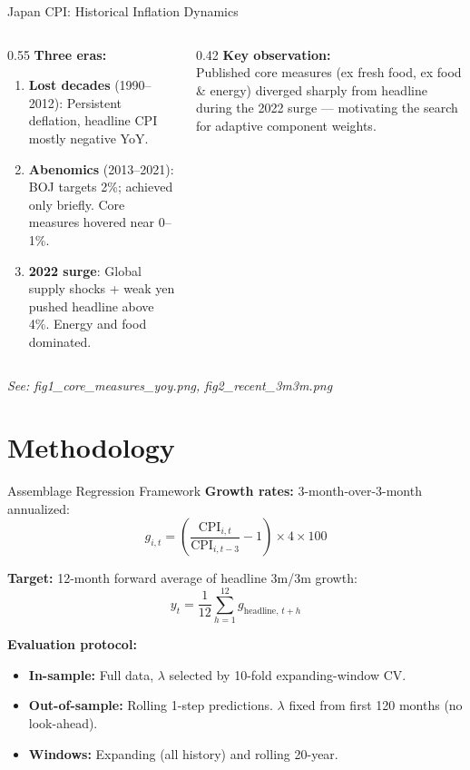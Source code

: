 \documentclass[aspectratio=169, 11pt]{beamer}
\begin{document}
\begin{frame}{Japan CPI: Historical Inflation Dynamics}
  \begin{columns}[T]
    \begin{column}{0.55\textwidth}
      \textbf{Three eras:}
      \begin{enumerate}
        \item \textbf{Lost decades} (1990--2012): Persistent deflation, headline
              CPI mostly negative YoY.
        \item \textbf{Abenomics} (2013--2021): BOJ targets 2\%; achieved only
              briefly.  Core measures hovered near 0--1\%.
        \item \textbf{2022 surge}: Global supply shocks + weak yen pushed
              headline above 4\%.  Energy and food dominated.
      \end{enumerate}
    \end{column}
    \begin{column}{0.42\textwidth}
      \textbf{Key observation:}\\[4pt]
      Published core measures (ex fresh food, ex food \& energy) diverged
      sharply from headline during the 2022 surge --- motivating the search
      for adaptive component weights.
    \end{column}
  \end{columns}
  \vfill
  \centering\small
  \textit{See: fig1\_core\_measures\_yoy.png, fig2\_recent\_3m3m.png}
\end{frame}

\section{Methodology}

\begin{frame}{Assemblage Regression Framework}
  \textbf{Growth rates:} 3-month-over-3-month annualized:
  \[
    g_{i,t} = \left(\frac{\text{CPI}_{i,t}}{\text{CPI}_{i,t-3}} - 1\right) \times 4 \times 100
  \]

  \textbf{Target:} 12-month forward average of headline 3m/3m growth:
  \[
    y_t = \frac{1}{12}\sum_{h=1}^{12} g_{\text{headline},\, t+h}
  \]

  \textbf{Evaluation protocol:}
  \begin{itemize}
    \item \textbf{In-sample:} Full data, $\lambda$ selected by 10-fold expanding-window CV.
    \item \textbf{Out-of-sample:} Rolling 1-step predictions.
          $\lambda$ fixed from first 120 months (no look-ahead).
    \item \textbf{Windows:} Expanding (all history) and rolling 20-year.
  \end{itemize}
\end{frame}
\end{document}
